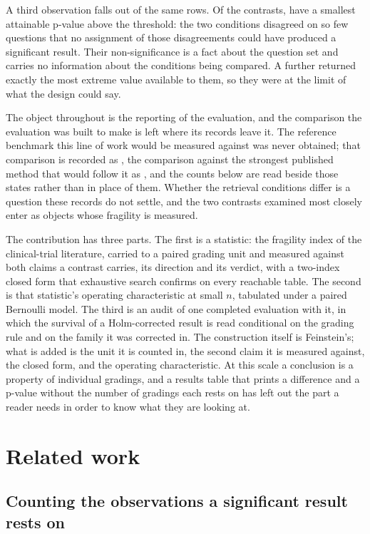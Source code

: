 A third observation falls out of the same rows. Of the \Contrasts{} contrasts,
\Incapable{} have a smallest attainable p-value above the threshold: the two
conditions disagreed on so few questions that no assignment of those
disagreements could have produced a significant result. Their non-significance
is a fact about the question set and carries no information about the
conditions being compared. A further \AtFloor{} returned exactly the most
extreme value available to them, so they were at the limit of what the design
could say.

The object throughout is the reporting of the evaluation, and the comparison
the evaluation was built to make is left where its records leave it. The
reference benchmark this line of work would be measured against was never
obtained; that comparison is recorded as \PrimaryTier{}, the comparison against
the strongest published method that would follow it as \SotaTier{}, and the
counts below are read beside those states rather than in place of them. Whether
the retrieval conditions differ is a question these records do not settle, and
the two contrasts examined most closely enter as objects whose fragility is
measured.

The contribution has three parts. The first is a statistic: the fragility index
of the clinical-trial literature, carried to a paired grading unit and measured
against both claims a contrast carries, its direction and its verdict, with a
two-index closed form that exhaustive search confirms on every reachable table.
The second is that statistic's operating characteristic at small \(n\),
tabulated under a paired Bernoulli model. The third is an audit of one completed
evaluation with it, in which the survival of a Holm-corrected result is read
conditional on the grading rule and on the family it was corrected in. The
construction itself is Feinstein's; what is added is the unit it is counted in,
the second claim it is measured against, the closed form, and the operating
characteristic. At this scale a conclusion is a property of individual
gradings, and a results table that prints a difference and a p-value without
the number of gradings each rests on has left out the part a reader needs in
order to know what they are looking at.

\section{Related work}

\subsection{Counting the observations a significant result rests on}

